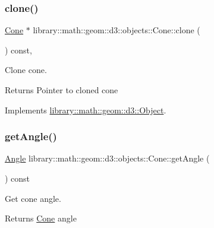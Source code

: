 \subsubsection{\texorpdfstring{clone()}{clone()}}
{\footnotesize\ttfamily \hyperlink{classlibrary_1_1math_1_1geom_1_1d3_1_1objects_1_1_cone}{Cone} $\ast$ library\+::math\+::geom\+::d3\+::objects\+::\+Cone\+::clone (\begin{DoxyParamCaption}{ }\end{DoxyParamCaption}) const\hspace{0.3cm}{\ttfamily [override]}, {\ttfamily [virtual]}}



Clone cone. 

\begin{DoxyReturn}{Returns}
Pointer to cloned cone 
\end{DoxyReturn}


Implements \hyperlink{classlibrary_1_1math_1_1geom_1_1d3_1_1_object_a1a784c6b359e0eb97cd34fabc42f2f3f}{library\+::math\+::geom\+::d3\+::\+Object}.

\mbox{\label{classlibrary_1_1math_1_1geom_1_1d3_1_1objects_1_1_cone_a430aeb7c5f4855b01c929bbb9079596f}} 
\subsubsection{\texorpdfstring{get\+Angle()}{getAngle()}}
{\footnotesize\ttfamily \hyperlink{classlibrary_1_1math_1_1geom_1_1_angle}{Angle} library\+::math\+::geom\+::d3\+::objects\+::\+Cone\+::get\+Angle (\begin{DoxyParamCaption}{ }\end{DoxyParamCaption}) const}



Get cone angle. 

\begin{DoxyReturn}{Returns}
\hyperlink{classlibrary_1_1math_1_1geom_1_1d3_1_1objects_1_1_cone}{Cone} angle 
\end{DoxyReturn}
\mbox{\label{classlibrary_1_1math_1_1geom_1_1d3_1_1objects_1_1_cone_a891fae1fe31a2a6c118059755887694c}} 
